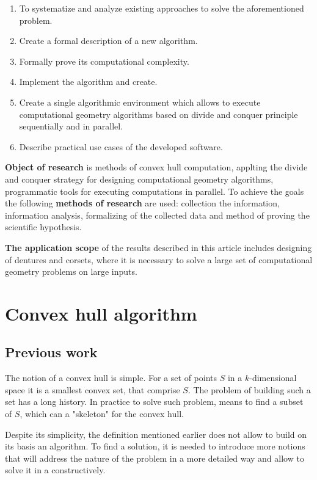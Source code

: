 \documentclass[conference]{IEEEtran}
\theoremstyle{plane}
\begin{document}
\begin{enumerate}
	\item
	To systematize and analyze existing approaches to solve the aforementioned problem.
	\item
	Create a formal description of a new algorithm.
	\item
	Formally prove its computational complexity.
	\item
	Implement the algorithm and create.
	\item 
	Create a single algorithmic environment which allows to execute computational geometry algorithms based on divide and conquer principle sequentially and in parallel.
	\item
	Describe practical use cases of the developed software.
\end{enumerate}

\textbf{Object of research} is methods of convex hull computation, applting the divide and conquer strategy for designing computational geometry algorithms, programmatic tools for executing computations in parallel. To achieve the goals the following \textbf{methods of research} are used: collection the information, information analysis, formalizing of the collected data and method of proving the scientific hypothesis.

\textbf{The application scope} of the results described in this article includes designing of dentures and corsets, where it is necessary to solve a large set of computational geometry problems on large inputs.


\section{Convex hull algorithm}
\subsection{Previous work}

The notion of a convex hull is simple. For a set of points $S$ in a $k$-dimensional space it is a smallest convex set, that comprise $S$. 
The problem of building such a set has a long history. In practice to solve such problem, means to find a subset of $S$, which can a "skeleton" for the convex hull.

Despite its simplicity, the definition mentioned earlier does not allow to build on its basis an algorithm. To find a solution, it is needed to introduce more notions that will address the nature of the problem in a more detailed way and allow to solve it in a constructively. 
\end{document}
